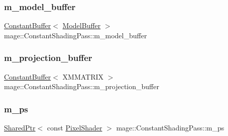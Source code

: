 \subsubsection{\texorpdfstring{m\+\_\+model\+\_\+buffer}{m\_model\_buffer}}
{\footnotesize\ttfamily \hyperlink{structmage_1_1_constant_buffer}{Constant\+Buffer}$<$ \hyperlink{structmage_1_1_model_buffer}{Model\+Buffer} $>$ mage\+::\+Constant\+Shading\+Pass\+::m\+\_\+model\+\_\+buffer\hspace{0.3cm}{\ttfamily [private]}}

\hypertarget{classmage_1_1_constant_shading_pass_a30185ffeeccd233573da5db7677a6169}{}\label{classmage_1_1_constant_shading_pass_a30185ffeeccd233573da5db7677a6169} 
\subsubsection{\texorpdfstring{m\+\_\+projection\+\_\+buffer}{m\_projection\_buffer}}
{\footnotesize\ttfamily \hyperlink{structmage_1_1_constant_buffer}{Constant\+Buffer}$<$ X\+M\+M\+A\+T\+R\+IX $>$ mage\+::\+Constant\+Shading\+Pass\+::m\+\_\+projection\+\_\+buffer\hspace{0.3cm}{\ttfamily [private]}}

\hypertarget{classmage_1_1_constant_shading_pass_aa7768c70069825ef231bcaa1cba15263}{}\label{classmage_1_1_constant_shading_pass_aa7768c70069825ef231bcaa1cba15263} 
\subsubsection{\texorpdfstring{m\+\_\+ps}{m\_ps}}
{\footnotesize\ttfamily \hyperlink{namespacemage_a1e01ae66713838a7a67d30e44c67703e}{Shared\+Ptr}$<$ const \hyperlink{namespacemage_ac98506b7edd999ea43ec46fbd0330238}{Pixel\+Shader} $>$ mage\+::\+Constant\+Shading\+Pass\+::m\+\_\+ps\hspace{0.3cm}{\ttfamily [private]}}

\hypertarget{classmage_1_1_constant_shading_pass_a3dc25d352bc4b9dcf9b06993e2e46c62}{}\label{classmage_1_1_constant_shading_pass_a3dc25d352bc4b9dcf9b06993e2e46c62} 
